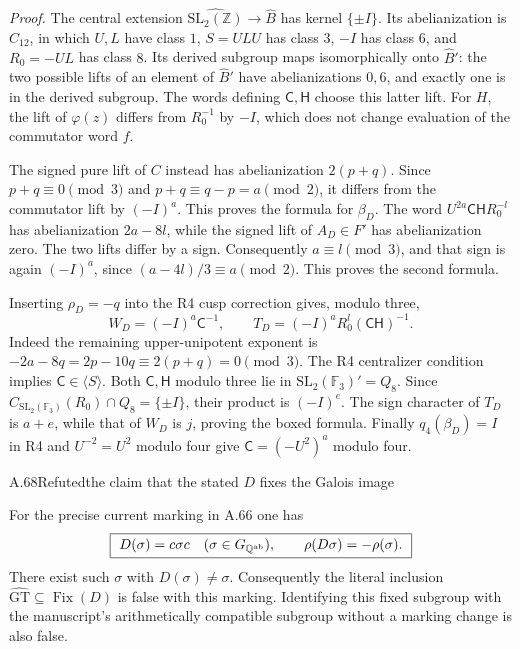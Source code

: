 \emph{Proof.}
The central extension $\widehat{\mathrm{SL}_2(\mathbb Z)}\to
\widehat B$ has kernel $\{\pm I\}$. Its abelianization is $C_{12}$,
in which $U,L$ have class $1$, $S=ULU$ has class $3$,
$-I$ has class $6$, and $R_0=-UL$ has class $8$.
Its derived subgroup maps isomorphically onto $\widehat B'$:
the two possible lifts of an element of $\widehat B'$ have
abelianizations $0,6$, and exactly one is in the derived subgroup.
The words defining $\mathsf C,\mathsf H$ choose this latter lift.
For $H$, the lift of $\varphi(z)$ differs from $R_0^{-1}$ by $-I$,
which does not change evaluation of the commutator word $f$.

The signed pure lift of $C$ instead has abelianization $2(p+q)$.
Since $p+q\equiv0\pmod3$ and
$p+q\equiv q-p=a\pmod2$, it differs from the commutator lift by
$(-I)^a$. This proves the formula for $\beta_D$. The word
$U^{2a}\mathsf C\mathsf H R_0^{-l}$ has abelianization
$2a-8l$, while the signed lift of $A_D\in F'$ has abelianization
zero. The two lifts differ by a sign. Consequently
$a\equiv l\pmod3$, and that sign is again $(-I)^a$, since
$(a-4l)/3\equiv a\pmod2$. This proves the second formula.

Inserting $\rho_D=-q$ into the R4 cusp correction gives, modulo
three,
\[
 W_D=(-I)^a\mathsf C^{-1},\qquad
 T_D=(-I)^aR_0^l(\mathsf C\mathsf H)^{-1}.
\]
Indeed the remaining upper-unipotent exponent is
$-2a-8q=2p-10q\equiv2(p+q)=0\pmod3$.
The R4 centralizer condition implies $\mathsf C\in\langle S\rangle$.
Both $\mathsf C,\mathsf H$ modulo three lie in
$\mathrm{SL}_2(\mathbb F_3)'=Q_8$. Since
$C_{\mathrm{SL}_2(\mathbb F_3)}(R_0)\cap Q_8=\{\pm I\}$,
their product is $(-I)^e$. The sign character of $T_D$ is $a+e$,
while that of $W_D$ is $j$, proving the boxed formula. Finally
$q_4(\beta_D)=I$ in R4 and $U^{-2}=U^2$ modulo four give
$\mathsf C=(-U^2)^a$ modulo four.

\begin{statement}{A.68}{Refuted}{the claim that the stated $D$ fixes the Galois image}
\end{statement}
For the precise current marking in A.66 one has
\[
 \boxed{\ D(\sigma)=c\sigma c
       \quad(\sigma\in G_{\mathbb Q^{\rm ab}}),\qquad
       \rho(D\sigma)=-\rho(\sigma).\ }
\]
There exist such $\sigma$ with $D(\sigma)\ne\sigma$.
Consequently the literal inclusion
$\widehat{\mathrm{GT}}\subseteq\operatorname{Fix}(D)$ is false
with this marking. Identifying this fixed subgroup with the manuscript's
arithmetically compatible subgroup without a marking change is also
false.

